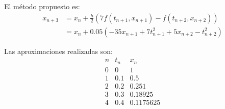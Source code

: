 \begin{ejercicio}
\begin{enumerate}
            El método propuesto es:
            \begin{align*}
                x_{n+3} &= x_n + \frac{h}{2}\left(7 f(t_{n+1}, x_{n+1}) - f(t_{n+2}, x_{n+2})\right) \\
                &= x_n + 0.05\left(-35x_{n+1} + 7t_{n+1}^2 +5x_{n+2} - t_{n+2}^2\right)
            \end{align*}

            Las aproximaciones realizadas son:
            \begin{equation*}
                \begin{array}{c|c|c}
                    n & t_n & x_n \\
                    \hline
                    0 & 0 & 1\\
                    1 & 0.1 & 0.5 \\
                    2 & 0.2 & 0.251 \\
                    3 & 0.3 & 0.18925 \\
                    4 & 0.4 & 0.1175625
                \end{array}
            \end{equation*}
    \end{enumerate}
\end{ejercicio}


